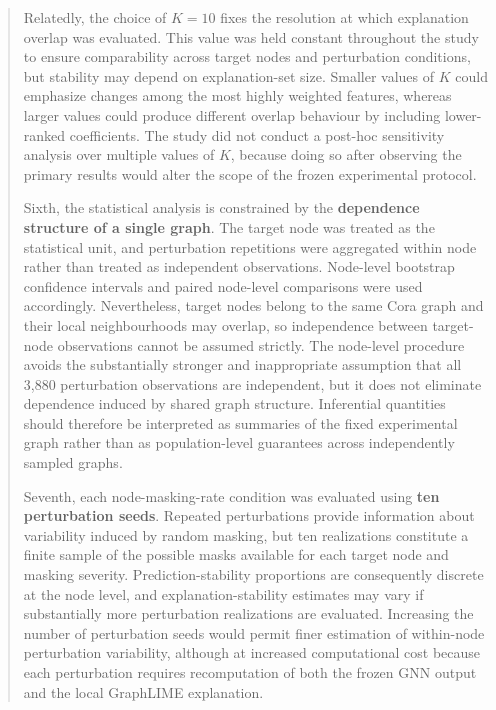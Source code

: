 \documentclass[a4paper]{article}
\begin{document}
\begin{quote}
Relatedly, the choice of \(K = 10\) fixes the resolution at which
explanation overlap was evaluated. This value was held constant
throughout the study to ensure comparability across target nodes and
perturbation conditions, but stability may depend on explanation-set
size. Smaller values of \(K\) could emphasize changes among the most
highly weighted features, whereas larger values could produce different
overlap behaviour by including lower-ranked coefficients. The study did
not conduct a post-hoc sensitivity analysis over multiple values of
\(K\), because doing so after observing the primary results would alter
the scope of the frozen experimental protocol.

Sixth, the statistical analysis is constrained by the \textbf{dependence
structure of a single graph}. The target node was treated as the
statistical unit, and perturbation repetitions were aggregated within
node rather than treated as independent observations. Node-level
bootstrap confidence intervals and paired node-level comparisons were
used accordingly. Nevertheless, target nodes belong to the same Cora
graph and their local neighbourhoods may overlap, so independence
between target-node observations cannot be assumed strictly. The
node-level procedure avoids the substantially stronger and inappropriate
assumption that all 3,880 perturbation observations are independent, but
it does not eliminate dependence induced by shared graph structure.
Inferential quantities should therefore be interpreted as summaries of
the fixed experimental graph rather than as population-level guarantees
across independently sampled graphs.

Seventh, each node-masking-rate condition was evaluated using
\textbf{ten perturbation seeds}. Repeated perturbations provide
information about variability induced by random masking, but ten
realizations constitute a finite sample of the possible masks available
for each target node and masking severity. Prediction-stability
proportions are consequently discrete at the node level, and
explanation-stability estimates may vary if substantially more
perturbation realizations are evaluated. Increasing the number of
perturbation seeds would permit finer estimation of within-node
perturbation variability, although at increased computational cost
because each perturbation requires recomputation of both the frozen GNN
output and the local GraphLIME explanation.


\end{quote}
\end{document}
